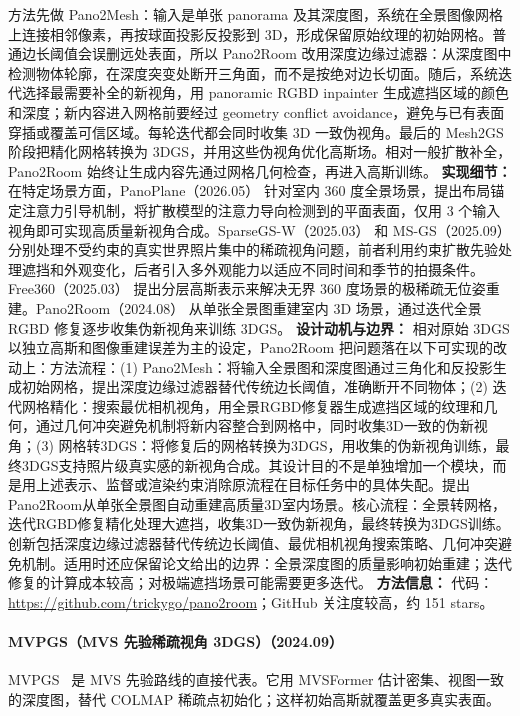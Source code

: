 方法先做 Pano2Mesh：输入是单张 panorama 及其深度图，系统在全景图像网格上连接相邻像素，再按球面投影反投影到 3D，形成保留原始纹理的初始网格。普通边长阈值会误删远处表面，所以 Pano2Room 改用深度边缘过滤器：从深度图中检测物体轮廓，在深度突变处断开三角面，而不是按绝对边长切面。随后，系统迭代选择最需要补全的新视角，用 panoramic RGBD inpainter 生成遮挡区域的颜色和深度；新内容进入网格前要经过 geometry conflict avoidance，避免与已有表面穿插或覆盖可信区域。每轮迭代都会同时收集 3D 一致伪视角。最后的 Mesh2GS 阶段把精化网格转换为 3DGS，并用这些伪视角优化高斯场。相对一般扩散补全，Pano2Room 始终让生成内容先通过网格几何检查，再进入高斯训练。
\textbf{实现细节：} 在特定场景方面，PanoPlane（2026.05） 针对室内 360 度全景场景，提出布局锚定注意力引导机制，将扩散模型的注意力导向检测到的平面表面，仅用 3 个输入视角即可实现高质量新视角合成。SparseGS-W（2025.03） 和 MS-GS（2025.09） 分别处理不受约束的真实世界照片集中的稀疏视角问题，前者利用约束扩散先验处理遮挡和外观变化，后者引入多外观能力以适应不同时间和季节的拍摄条件。Free360（2025.03） 提出分层高斯表示来解决无界 360 度场景的极稀疏无位姿重建。Pano2Room（2024.08） 从单张全景图重建室内 3D 场景，通过迭代全景 RGBD 修复逐步收集伪新视角来训练 3DGS。
\textbf{设计动机与边界：} 相对原始 3DGS 以独立高斯和图像重建误差为主的设定，Pano2Room 把问题落在以下可实现的改动上：方法流程：(1) Pano2Mesh：将输入全景图和深度图通过三角化和反投影生成初始网格，提出深度边缘过滤器替代传统边长阈值，准确断开不同物体；(2) 迭代网格精化：搜索最优相机视角，用全景RGBD修复器生成遮挡区域的纹理和几何，通过几何冲突避免机制将新内容整合到网格中，同时收集3D一致的伪新视角；(3) 网格转3DGS：将修复后的网格转换为3DGS，用收集的伪新视角训练，最终3DGS支持照片级真实感的新视角合成。其设计目的不是单独增加一个模块，而是用上述表示、监督或渲染约束消除原流程在目标任务中的具体失配。提出Pano2Room从单张全景图自动重建高质量3D室内场景。核心流程：全景转网格，迭代RGBD修复精化处理大遮挡，收集3D一致伪新视角，最终转换为3DGS训练。创新包括深度边缘过滤器替代传统边长阈值、最优相机视角搜索策略、几何冲突避免机制。适用时还应保留论文给出的边界：全景深度图的质量影响初始重建；迭代修复的计算成本较高；对极端遮挡场景可能需要更多迭代。
\textbf{方法信息：} 代码：\url{https://github.com/trickygo/pano2room}；GitHub 关注度较高，约 151 stars。



\paragraph{MVPGS（MVS 先验稀疏视角 3DGS）（2024.09）}
MVPGS~\cite{2409_14316} 是 MVS 先验路线的直接代表。它用 MVSFormer 估计密集、视图一致的深度图，替代 COLMAP 稀疏点初始化；这样初始高斯就覆盖更多真实表面。

